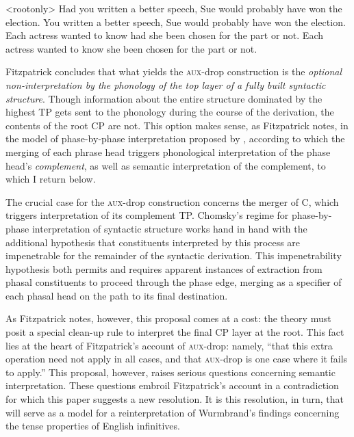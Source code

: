 \documentclass[output=paper]{langscibook}
\begin{document}
\pex<rootonly>
\a Had you written a better speech, Sue would probably have won the election.
\a *You written a better speech,  Sue would probably have won the election.
\xe
{}
\a Each actress wanted to know had she been chosen for the part or not.
\a \ljudge{*}Each actress wanted to know she been chosen for the part or not.
\xe

Fitzpatrick concludes that what yields the \textsc{aux}-drop construction is the \textit{optional non-interpretation by the phonology of the top layer of a fully built syntactic structure}. Though information about the entire structure dominated by the highest TP gets sent to the phonology during the course of the derivation, the contents of the root CP are not. This option makes sense, as Fitzpatrick notes, in the model of phase-by-phase interpretation proposed by \citet{Chomsky2001}, according to which the merging of each phrase head triggers phonological interpretation of the phase head's \textit{complement}, as well as semantic interpretation of the complement, to which I return below.\largerpage

\begin{sloppypar}
The crucial case for the \textsc{aux}-drop construction concerns the merger of C, which triggers interpretation of its complement TP. Chomsky's \citeyearpar{Chomsky2001} regime for phase-by-phase interpretation of syntactic structure works hand in hand with the additional hypothesis that constituents interpreted by this process are impenetrable for the remainder of the syntactic derivation. This impenetrability hypothesis both permits and requires apparent instances of extraction from phasal constituents to proceed through the phase edge, merging as a specifier of each phasal head on the path to its final destination. 
\end{sloppypar}

As Fitzpatrick notes, however, this proposal comes at a cost: the theory must posit a special clean-up rule to interpret the final CP layer at the root. This fact lies at the heart of Fitzpatrick's account of \textsc{aux-}drop: namely, “that this extra operation need not apply in all cases, and that \textsc{aux}-drop is one case where it fails to apply.” This proposal, however, raises serious questions concerning semantic interpretation. These questions embroil Fitzpatrick's account in a contradiction for which this paper suggests a new resolution. It is this resolution, in turn, that will serve as a model for a reinterpretation of Wurmbrand's \citeyearpar{Wurmbrand:2014aa} findings concerning the tense properties of English infinitives. 
\end{document}
